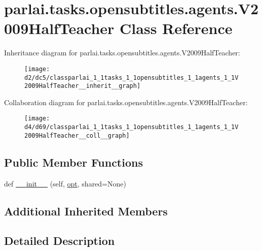 \hypertarget{classparlai_1_1tasks_1_1opensubtitles_1_1agents_1_1V2009HalfTeacher}{}\section{parlai.\+tasks.\+opensubtitles.\+agents.\+V2009\+Half\+Teacher Class Reference}
\label{classparlai_1_1tasks_1_1opensubtitles_1_1agents_1_1V2009HalfTeacher}


Inheritance diagram for parlai.\+tasks.\+opensubtitles.\+agents.\+V2009\+Half\+Teacher\+:\nopagebreak
\begin{figure}[H]
\begin{center}
\leavevmode
\texttt{[image: d2/dc5/classparlai\_1\_1tasks\_1\_1opensubtitles\_1\_1agents\_1\_1V2009HalfTeacher\_\_inherit\_\_graph]}
\end{center}
\end{figure}


Collaboration diagram for parlai.\+tasks.\+opensubtitles.\+agents.\+V2009\+Half\+Teacher\+:\nopagebreak
\begin{figure}[H]
\begin{center}
\leavevmode
\texttt{[image: d4/d69/classparlai\_1\_1tasks\_1\_1opensubtitles\_1\_1agents\_1\_1V2009HalfTeacher\_\_coll\_\_graph]}
\end{center}
\end{figure}
\subsection*{Public Member Functions}
\begin{DoxyCompactItemize}
\item 
def \hyperlink{classparlai_1_1tasks_1_1opensubtitles_1_1agents_1_1V2009HalfTeacher_a9bc739825e9990d471efa003e92e52d4}{\+\_\+\+\_\+init\+\_\+\+\_\+} (self, \hyperlink{classparlai_1_1core_1_1teachers_1_1FbDialogTeacher_af7a9ec497b9cd0292d7b8fa220da7c28}{opt}, shared=None)
\end{DoxyCompactItemize}
\subsection*{Additional Inherited Members}


\subsection{Detailed Description}


